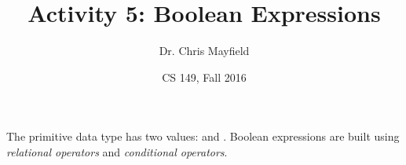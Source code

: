 \documentclass[12pt]{article}
\title{Activity 5: Boolean Expressions}
\author{Dr. Chris Mayfield}
\date{CS 149, Fall 2016}
\begin{document}
\maketitle

The primitive data type  has two values:  and .
Boolean expressions are built using \emph{relational operators} and \emph{conditional operators}.



\newpage

\newpage

\end{document}
